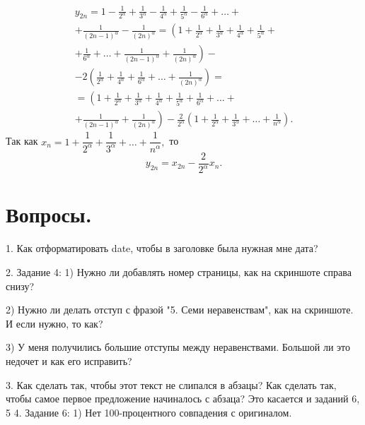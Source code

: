 \documentclass[a4paper,12pt]{article} %
\begin{document}
	\begin{multline*}
		y_{2n} = 1 - 
		\frac{1}{2^ \alpha} + 
		\frac{1}{3^ \alpha} -
		\frac{1}{4^ \alpha} +
		\frac{1}{5^ \alpha} -
		\frac{1}{6^ \alpha} + 
		\dots + \\
		+ \frac{1}{ \left(2n - 1 \right)^ \alpha} -
		\frac{1}{ \left(2n \right)^ \alpha} =
		\left(
			1 + 
			\frac{1}{2^ \alpha} + 
			\frac{1}{3^ \alpha} +
			\frac{1}{4^ \alpha} +
			\frac{1}{5^ \alpha} +
		\right. \\
		\left.
			+ \frac{1}{6^ \alpha} +
			\dots +
			\frac{1}{ \left(2n - 1 \right)^ \alpha} +
			\frac{1}{ \left(2n \right)^ \alpha}
		\right) - \\
		- 2
		\left(
			\frac{1}{2^ \alpha} + 
			\frac{1}{4^ \alpha} +
			\frac{1}{6^ \alpha} +
			\dots +
			\frac{1}{ \left(2n \right)^ \alpha}
		\right) = \\
		= \left(
			1 + 
			\frac{1}{2^ \alpha} + 
			\frac{1}{3^ \alpha} +
			\frac{1}{4^ \alpha} +
			\frac{1}{5^ \alpha} +
			\frac{1}{6^ \alpha} +
			\dots + 
		\right. \\
		\left.
			+ \frac{1}{ \left(2n - 1 \right)^ \alpha} +
			\frac{1}{ \left(2n \right)^ \alpha}
		\right)
		- \frac{2}{2^ \alpha}
		\left(
		1 +
		\frac{1}{2^ \alpha} + 
		\frac{1}{3^ \alpha} +
		\dots +
		\frac{1}{n^ \alpha}
		\right).
	\end{multline*}
	Так как 
	$x_n = 1 + 
	\dfrac{1}{2^ \alpha} + 
	\dfrac{1}{3^ \alpha} +
	\dots +
	\dfrac{1}{n^ \alpha},$
	то 
	$$y_{2n} = x_{2n} - \dfrac{2}{2^ \alpha} x_n.$$
	\section{Вопросы.}
	1. Как отформатировать date, чтобы в заголовке была нужная мне дата?
	
	2. Задание 4:
		1) Нужно ли добавлять номер страницы, как на скриншоте справа снизу?
		
		2) Нужно ли делать отступ с фразой "5. Семи неравенствам", как на скриншоте. И если нужно, то как?
		
		3) У меня получились большие отступы между неравенствами. Большой ли это недочет и как его исправить?
		
	3. Как сделать так, чтобы этот текст не слипался в абзацы? Как сделать так, чтобы самое первое предложение начиналось с абзаца? Это касается и заданий 6, 5
	4. Задание 6:
		1) Нет 100-процентного совпадения с оригиналом.
	
\end{document}

